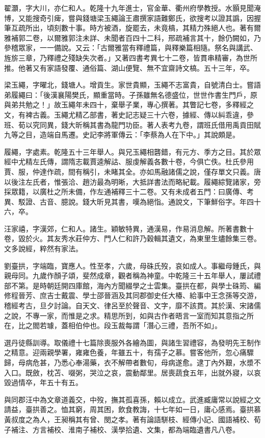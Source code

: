 \begin{pinyinscope}
翟灝，字大川，亦仁和人。乾隆十九年進士，官金華、衢州府學教授。水顥見聞淹博，又能搜奇引痺，嘗與錢塘梁玉繩論王肅撰家語難鄭氏，欲搜考以證其譌，因握筆互疏所出，頃刻數十事。時方被酒，旋罷去，未竟槁，其精力殊絕人也。著有爾雅補郭二卷，以爾雅郭注未詳、未聞者百四十二科，邢疏補言其十，餘仍闕如，乃參稽眾家，一一備說。又云：「古爾雅當有釋禮篇，與釋樂篇相隨。祭名與講武、旌旂三章，乃釋禮之殘缺失次者。」又著四書考異七十二卷，皆貫串精審，為世所推。他著又有家語發覆、通俗篇、湖山便覽、無不宜齋詩文槁。五十三年，卒。

梁玉繩，字曜北，錢塘人。增貢生。家世貴顯，玉繩不志富貴，自號清白士。嘗語弟履繩曰：「後漢襄陽樊氏，顯重當時。子孫雖無名德盛位，世世作書生門戶，原與弟共勉之！」故玉繩年未四十，棄舉子業，專心撰著。其瞥記七卷，多釋經之文，有裨古義。玉繩尤精乙部書，著史記志疑三十六卷，據經、傳以糾乖違，參班、荀以究同異，錢大昕稱其書為龍門功臣。著人表考九卷，謂班氏借用禹貢田賦九等之目，造端自馬遷。史記李將軍傳云：「李蔡為人在下中。」其說頗是。

履繩，字處素。乾隆五十三年舉人。與兄玉繩相礱錯，有元方、季方之目。其於眾經中尤精左氏傳，謂隋志載賈逵解詁、服虔解義各數十卷，今俱亡佚。杜氏參用賈、服，仲達作疏，間有稱引，未睹其全。亦如馬融諸儒之說，僅存單文只義。唐以後注左氏者，惟張洽、趙汸最為明晰，大抵詳書法而略紀載。履繩綜覽諸家，旁採眾籍，以廣杜之所未備，作左通補釋三十二卷。又有未成者五門：曰廣傳、考異、駁證、古音、臆說。錢大昕見其書，嘆為絕恉。通說文，下筆鮮俗字。年四十六，卒。

汪家禧，字漢郊，仁和人。諸生。穎敏特異，通漢易，作易消息解。所著書數十卷，毀於火。其友秀水莊仲方、門人仁和許乃穀輯其遺文，為東里生燼餘集三卷。文多說經，粹然有家法。

劉臺拱，字端臨，寶應人。性至孝，六歲，母硃氏歿，哀如成人。事繼母鍾氏，與親母同。九歲作顏子頌，斐然成章，觀者稱為神童。中乾隆三十五年舉人，屢試禮部不第。是時朝廷開四庫館，海內方聞綴學之士雲集。臺拱在都，與學士硃筠、編修程晉芳、庶吉士戴震、學士邵晉涵及其同郡御史任大椿、給事中王念孫等交游，稽經考古，旦夕討論。自天文、律呂至於聲音、文字，靡不該貫。其於漢、宋諸儒之說，不專一家，而惟是之求。精思所到，如與古作者晤言一室而知其意指之所在，比之閻若璩，蓋相伯仲也。段玉裁每謂「潛心三禮，吾所不如」。

選丹徒縣訓導。取儀禮十七篇除喪服外各繪為圖，與諸生習禮容，為發明先王制作之精意。迎兩親學署，雍雍色養，年雖五十，有孺子之慕。嘗客他所，忽心痛驟歸，母病危甚，乃悉心奉湯藥，衣不解帶者數旬，母病遂愈。逮丁內外艱，水漿不入口。既斂，枕苫、啜粥，哭泣之哀，震動鄰里。居喪蔬食五年，出就外寢，以哀毀過情卒，年五十有五。

與同郡汪中為文章道義交，中歿，撫其孤喜孫，賴以成立。武進臧庸常以說經之文請益，臺拱善之。恤其窮，周其困，飲食教誨，十七年如一日，庸心感焉。臺拱慕黃叔度之為人，王昶稱其有曾、閔之孝。著有論語駢枝、經傳小記、國語補校、荀子補注、方言補校、淮南子補校、漢學拾遺、文集，都為端臨遺書凡八卷。


\end{pinyinscope}
